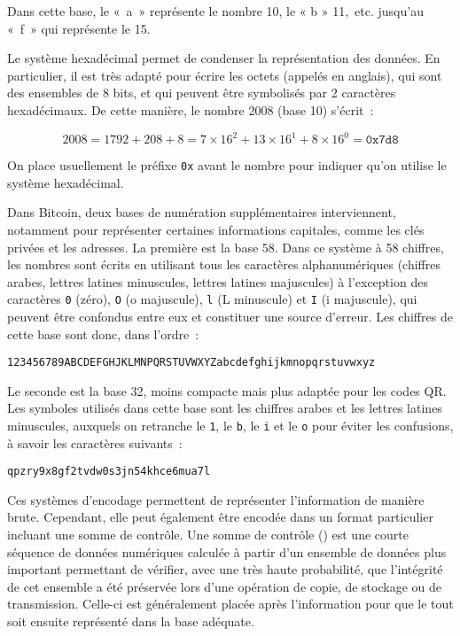 Dans cette base, le «~a~» représente le nombre 10, le « b » 11,~etc. jusqu'au «~f~» qui représente le 15.

Le système hexadécimal permet de condenser la représentation des données. En particulier, il est très adapté pour écrire les octets (appelés  en anglais), qui sont des ensembles de 8 bits, et qui peuvent être symbolisés par 2 caractères hexadécimaux. De cette manière, le nombre 2008 (base 10) s'écrit~:

{ \small
\[
2008 = 1792 + 208 + 8 = 7 \times 16^2 + 13 \times 16^1 + 8 \times 16^0 = \mathtt{0x7d8}
\]
}

On place usuellement le préfixe \texttt{0x} avant le nombre pour indiquer qu'on utilise le système hexadécimal.


Dans Bitcoin, deux bases de numération supplémentaires interviennent, notamment pour représenter certaines informations capitales, comme les clés privées et les adresses. La première est la base 58. Dans ce système à 58 chiffres, les nombres sont écrits en utilisant tous les caractères alphanumériques (chiffres arabes, lettres latines minuscules, lettres latines majuscules) à l'exception des caractères \texttt{0} (zéro), \texttt{O} (o majuscule), \texttt{l} (L minuscule) et \texttt{I} (i majuscule), qui peuvent être confondus entre eux et constituer une source d'erreur. Les chiffres de cette base sont donc, dans l'ordre~:

\begin{Verbatim}[fontsize=\small]
123456789ABCDEFGHJKLMNPQRSTUVWXYZabcdefghijkmnopqrstuvwxyz
\end{Verbatim}


Le seconde est la base 32, moins compacte mais plus adaptée pour les codes QR. Les symboles utilisés dans cette base sont les chiffres arabes et les lettres latines minuscules, auxquels on retranche le \texttt{1}, le \texttt{b}, le \texttt{i} et le \texttt{o} pour éviter les confusions, à savoir les caractères suivants~:

\begin{Verbatim}[fontsize=\small]
qpzry9x8gf2tvdw0s3jn54khce6mua7l
\end{Verbatim}


Ces systèmes d'encodage permettent de représenter l'information de manière brute. Cependant, elle peut également être encodée dans un format particulier incluant une somme de contrôle. Une somme de contrôle () est une courte séquence de données numériques calculée à partir d'un ensemble de données plus important permettant de vérifier, avec une très haute probabilité, que l'intégrité de cet ensemble a été préservée lors d'une opération de copie, de stockage ou de transmission. Celle-ci est généralement placée après l'information pour que le tout soit ensuite représenté dans la base adéquate.

